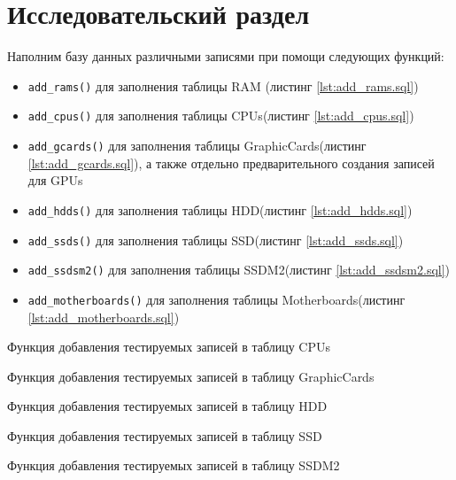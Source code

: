 \chapter{Исследовательский раздел}

Наполним базу данных различными записями при помощи следующих функций:
\begin{itemize}
  \item 
    \verb|add_rams()| для заполнения таблицы RAM (листинг \ref{lst:add_rams.sql})
  \item 
    \verb|add_cpus()| для заполнения таблицы CPUs(листинг \ref{lst:add_cpus.sql})
  \item 
    \verb|add_gcards()| для заполнения таблицы GraphicCards(листинг \ref{lst:add_gcards.sql}), а также отдельно предварительного создания записей для GPUs
  \item 
    \verb|add_hdds()| для заполнения таблицы HDD(листинг \ref{lst:add_hdds.sql})
  \item 
    \verb|add_ssds()| для заполнения таблицы SSD(листинг \ref{lst:add_ssds.sql})
  \item 
    \verb|add_ssdsm2()| для заполнения таблицы SSDM2(листинг \ref{lst:add_ssdsm2.sql})
  \item 
    \verb|add_motherboards()| для заполнения таблицы Motherboards(листинг \ref{lst:add_motherboards.sql})
\end{itemize}



{Функция добавления тестируемых записей в таблицу CPUs}

{Функция добавления тестируемых записей в таблицу GraphicCards}

{Функция добавления тестируемых записей в таблицу HDD}

{Функция добавления тестируемых записей в таблицу SSD}

{Функция добавления тестируемых записей в таблицу SSDM2}

